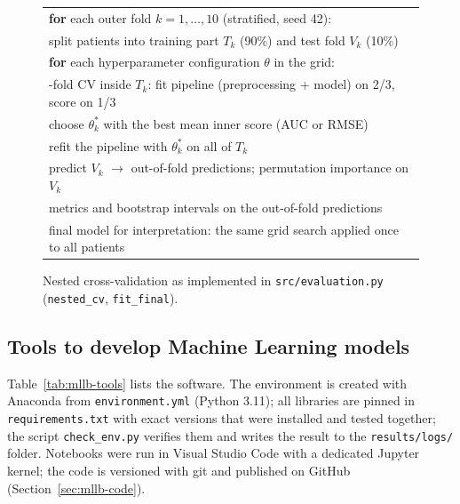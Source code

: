 \begin{figure}[H]
\centering
\begin{tabular}{|p{}|}
\hline
\textbf{for} each outer fold $k = 1,\dots,10$ (stratified, seed 42):\\
\quad split patients into training part $T_k$ (90\%) and test fold $V_k$ (10\%)\\
\quad \textbf{for} each hyperparameter configuration $\theta$ in the grid:\\
\qquad 3-fold CV inside $T_k$: fit pipeline (preprocessing + model) on 2/3, score on 1/3\\
\quad choose $\theta^*_k$ with the best mean inner score (AUC or RMSE)\\
\quad refit the pipeline with $\theta^*_k$ on all of $T_k$\\
\quad predict $V_k$ $\rightarrow$ out-of-fold predictions; permutation importance on $V_k$\\
metrics and bootstrap intervals on the \NClean{} out-of-fold predictions\\
final model for interpretation: the same grid search applied once to all patients\\
\hline
\end{tabular}
\caption{Nested cross-validation as implemented in \texttt{src/\allowbreak{}evaluation.\allowbreak{}py} (\texttt{nested\_cv},
\texttt{fit\_final}).}
\label{fig:mllb-nested}
\end{figure}

\subsection{Tools to develop Machine Learning models}

Table~\ref{tab:mllb-tools} lists the software. The environment is created with Anaconda from
\texttt{environment.yml} (Python 3.11); all libraries are pinned in \texttt{requirements.\allowbreak{}txt} with
exact versions that were installed and tested together; the script \texttt{check\_env.py} verifies them
and writes the result to the
\texttt{results/logs/} folder. Notebooks were run in Visual Studio Code with a
dedicated Jupyter kernel; the code is versioned with git and published on GitHub
(Section~\ref{sec:mllb-code}).


